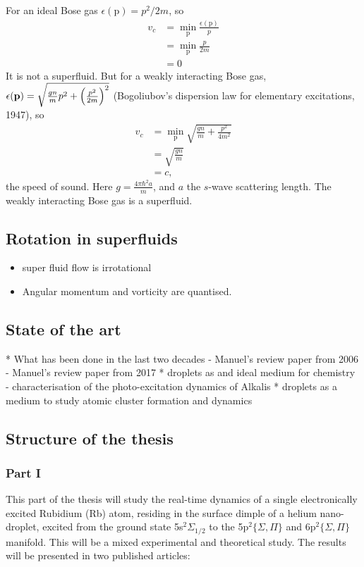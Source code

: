 \documentclass[11pt,a4paper,twoside]{article}
\renewcommand{\vec}[1]{\bm{\mathrm{#1}}}
\begin{document}
			For an ideal Bose gas $\epsilon(\vec{p})=p^2/2m$, so 
			\begin{align}
				v_c &= \min_{\vec{p}}\frac{\epsilon(\vec{p})}{p} \\
					&= \min_{\vec{p}}\frac{p}{2m} \\
					&= 0
			\end{align}
			It is not a superfluid. But for a weakly interacting Bose gas, $\epsilon(\vec{p})=\sqrt{\frac{gn}{m}p^2+\qty(\frac{p^2}{2m})^2}$ (Bogoliubov's dispersion law for elementary excitations, 1947), so
			\begin{align}
				v_c &=\min_{\vec{p}}\sqrt{\frac{gn}{m}+\frac{p^2}{4m^2}} \\
					&= \sqrt{\frac{gn}{m}} \\
					&= c,
			\end{align}
			the speed of sound. Here $g=\frac{4\pi\hbar^2a}{m}$, and $a$ the $s$-wave scattering length. The weakly interacting Bose gas is a superfluid.	
			
		\subsection{Rotation in superfluids}
			\begin{itemize}
				\item super fluid flow is irrotational
				\item Angular momentum and vorticity are quantised.
			\end{itemize}
			
	\subsection{State of the art}
		* What has been done in the last two decades
			- Manuel's review paper from 2006
			- Manuel's review paper from 2017
		* droplets as and ideal medium for chemistry
			- characterisation of the photo-excitation dynamics of Alkalis
		* droplets as a medium to study atomic cluster formation and dynamics
	
	\subsection{Structure of the thesis}
		\subsubsection{Part I}
			This part of the thesis will study the real-time dynamics of a single electronically excited Rubidium (Rb) atom, residing in the surface dimple of a helium nano-droplet, excited from the ground state 5s$^2\Sigma_{1/2}$ to the 5p$^2\{\Sigma,\Pi\}$ and 6p$^2\{\Sigma,\Pi\}$ manifold. This will be a mixed experimental and theoretical study. The results will be presented in two published articles:
			
\end{document}
